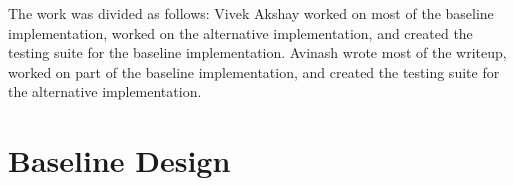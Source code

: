 \documentclass[10pt]{article}
\begin{document}
The work was divided as follows:
Vivek 
Akshay worked on most of the baseline implementation, worked on the alternative implementation, and created the testing suite for the baseline implementation.
Avinash wrote most of the writeup, worked on part of the baseline implementation, and created the testing suite for the alternative implementation. \\






\section{Baseline Design}
\end{document}
